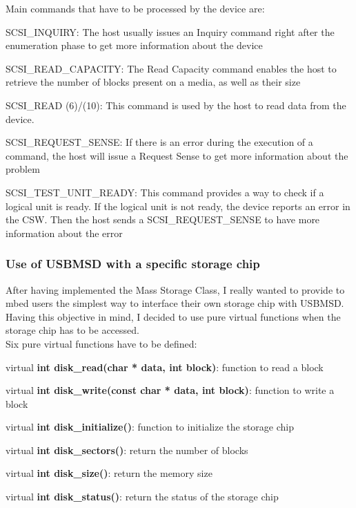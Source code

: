 \documentclass[pdftex,10pt,a4paper]{report}
\newenvironment{packed_item}{
\begin{itemize}
  \setlength{\itemsep}{1pt}
  \setlength{\parskip}{0pt}
  \setlength{\parsep}{0pt}
}{\end{itemize}}
\begin{document}
Main commands that have to be processed by the device are:
\begin{packed_item}
	\item SCSI\_INQUIRY: The host usually issues an Inquiry command right after the enumeration phase to get more
information about the device

	\item SCSI\_READ\_CAPACITY: The Read Capacity command enables the host to retrieve the number of blocks present on a
media, as well as their size

	\item SCSI\_READ (6)/(10): This command is used by the host to read data from the device.
	
	\item SCSI\_REQUEST\_SENSE: If there is an error during the execution of a command, the host will issue a
Request Sense to get more information about the problem

	\item SCSI\_TEST\_UNIT\_READY: This command provides a way to check if a logical unit is ready. If the logical unit is not ready, the device reports an error in the CSW. Then the host sends a SCSI\_REQUEST\_SENSE to have more information about the error
\end{packed_item}

\subsubsection{Use of USBMSD with a specific storage chip}
After having implemented the Mass Storage Class, I really wanted to provide to mbed users the simplest way to interface their own storage chip with USBMSD. Having this objective in mind, I decided to use pure virtual functions when the storage chip has to be accessed. \\

Six pure virtual functions have to be defined:
\begin{packed_item}
	\item virtual \textbf{int disk\_read(char * data, int block)}: function to read a block
	\item virtual \textbf{int disk\_write(const char * data, int block)}: function to write a block
	\item virtual \textbf{int disk\_initialize()}: function to initialize the storage chip
	\item virtual \textbf{int disk\_sectors()}: return the number of blocks
	\item virtual \textbf{int disk\_size()}: return the memory size
	\item virtual \textbf{int disk\_status()}: return the status of the storage chip
\end{packed_item}
\end{document}
